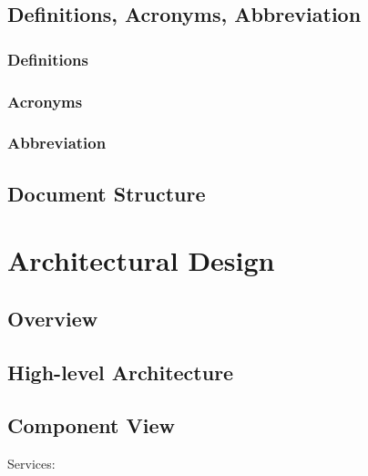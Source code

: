 \documentclass[a4paper]{article}
\begin{document}
\clearpage

\subsection{Definitions, Acronyms, Abbreviation}

\subsubsection{Definitions}
\subsubsection{Acronyms}
\subsubsection{Abbreviation}

\clearpage    

\subsection{Document Structure}
\clearpage

\section{Architectural Design}

\subsection{Overview}

\subsection{High-level Architecture}

\clearpage

\subsection{Component View}

Services:\newline
\end{document}

